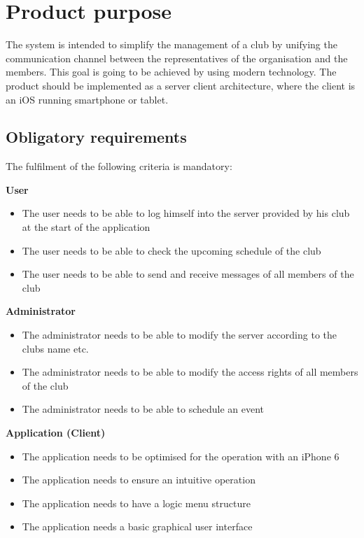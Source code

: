 \pagestyle{fancy}
\lhead{}
\renewcommand{\headrulewidth}{0pt}
\setlength{\headheight}{14pt}

\chapter{Product purpose}

The system is intended to simplify the management of a club by unifying the communication channel between the representatives of the organisation and the members. This goal is going to be achieved by using modern technology. The product should be implemented as a server client architecture, where the client is an iOS running smartphone or tablet. 

\section{Obligatory requirements} %
The fulfilment of the following criteria is mandatory:

\textbf{User}
\begin{itemize}
\item The user needs to be able to log himself into the server provided by his club at the start of the application
\item The user needs to be able to check the upcoming schedule of the club
\item The user needs to be able to send and receive messages of all members of the club
\end{itemize}

\textbf{Administrator}
\begin{itemize}
\item The administrator needs to be able to modify the server according to the clubs name etc.
\item The administrator needs to be able to modify the access rights of all members of the club
\item The administrator needs to be able to schedule an event
\end{itemize}

\textbf{Application (Client)}
\begin{itemize}
\item The application needs to be optimised for the operation with an iPhone 6
\item The application needs to ensure an intuitive operation
\item The application needs to have a logic menu structure
\item The application needs a basic graphical user interface
\end{itemize}

